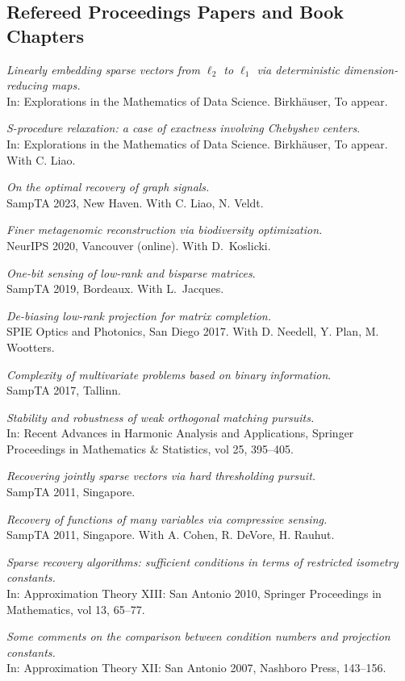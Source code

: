 \documentclass[11pt]{article}
\begin{document}
\subsection{Refereed Proceedings Papers and Book Chapters}
\betaremune
\item {\sl Linearly embedding sparse vectors from $\ell_2$ to $\ell_1$
via deterministic dimension-reducing maps.}\\
In: Explorations in the Mathematics of Data Science. Birkh\"auser, To appear.
\item {\sl S-procedure relaxation: a case of exactness involving Chebyshev centers}.\\
In: Explorations in the Mathematics of Data Science. Birkh\"auser, To appear. With C. Liao.
\item {\sl On the optimal recovery of graph signals.}\\
SampTA 2023, New Haven.  With C. Liao, N. Veldt.
\item {\sl Finer metagenomic reconstruction via biodiversity optimization.}\\
NeurIPS 2020, Vancouver (online).
With D.~Koslicki.
\item {\sl One-bit sensing of low-rank and bisparse matrices}.\\
SampTA 2019, Bordeaux. With L.~Jacques.
\item {\sl De-biasing low-rank projection for matrix completion.}\\
SPIE Optics and Photonics, San Diego 2017.
With D. Needell, Y. Plan, M. Wootters.
\item {\sl Complexity of multivariate problems based on binary information}.\\
SampTA 2017, Tallinn.
\item {\sl Stability and robustness of weak orthogonal matching pursuits.}\\
In: Recent Advances in Harmonic Analysis and  Applications,
Springer Proceedings in Mathematics \& Statistics, vol 25, 395--405.
\item {\sl Recovering jointly sparse vectors via hard thresholding pursuit.}\\ 
SampTA 2011, Singapore.
\item {\sl Recovery of functions of many variables via compressive sensing.}\\
SampTA 2011, Singapore. 
With A. Cohen, R. DeVore, H. Rauhut.
\item {\sl Sparse recovery algorithms: sufficient conditions in terms of restricted isometry constants.}\\
In: Approximation Theory XIII: San Antonio 2010, Springer Proceedings in Mathematics, vol 13, 65--77.
\item {\sl  Some comments on the comparison between condition numbers and projection constants.}\\
In: Approximation Theory XII: San Antonio 2007, Nashboro Press, 143--156. 
\eetaremune
\end{document}
